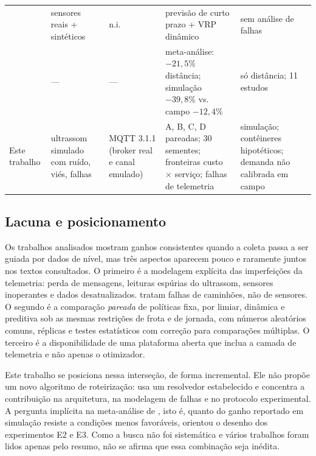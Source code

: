 \begin{table}[ht]
\begin{tabularx}{\textwidth}{@{}>{\raggedright\arraybackslash}p{3.45cm}>{\raggedright\arraybackslash}X>{\raggedright\arraybackslash}p{1.95cm}>{\raggedright\arraybackslash}X>{\raggedright\arraybackslash}X@{}}
\cite{iosif2026optimizing} & sensores reais + sintéticos & n.i. & previsão de curto prazo + VRP dinâmico & sem análise de falhas \\
\cite{maciel2025impact} & --- & --- & meta-análise: $-21{,}5\%$ distância; simulação $-39{,}8\%$ vs. campo $-12{,}4\%$ & só distância; 11 estudos \\
\midrule
Este trabalho & ultrassom simulado com ruído, viés, falhas & MQTT 3.1.1 (broker real e canal emulado) & A, B, C, D pareadas; 30 sementes; fronteiras custo $\times$ serviço; falhas de telemetria & simulação; contêineres hipotéticos; demanda não calibrada em campo \\
\bottomrule
\end{tabularx}
\end{table}

\subsection{Lacuna e posicionamento}

Os trabalhos analisados mostram ganhos consistentes quando a coleta passa a
ser guiada por dados de nível, mas três aspectos aparecem pouco e raramente
juntos nos textos consultados. O primeiro é a modelagem explícita das
imperfeições da telemetria: perda de mensagens, leituras espúrias do
ultrassom, sensores inoperantes e dados desatualizados. \cite{anagnostopoulos2015robust}
tratam falhas de caminhões, não de sensores. O segundo é a comparação
\emph{pareada} de políticas fixa, por limiar, dinâmica e preditiva sob as
mesmas restrições de frota e de jornada, com números aleatórios comuns,
réplicas e testes estatísticos com correção para comparações múltiplas. O
terceiro é a disponibilidade de uma plataforma aberta que inclua a camada de
telemetria e não apenas o otimizador.

Este trabalho se posiciona nessa interseção, de forma incremental. Ele não
propõe um novo algoritmo de roteirização: usa um resolvedor estabelecido e
concentra a contribuição na arquitetura, na modelagem de falhas e no
protocolo experimental. A pergunta implícita na meta-análise de
\cite{maciel2025impact}, isto é, quanto do ganho reportado em simulação resiste a
condições menos favoráveis, orientou o desenho dos experimentos E2 e E3. Como a
busca não foi sistemática e vários trabalhos foram lidos apenas pelo resumo,
não se afirma que essa combinação seja inédita.

